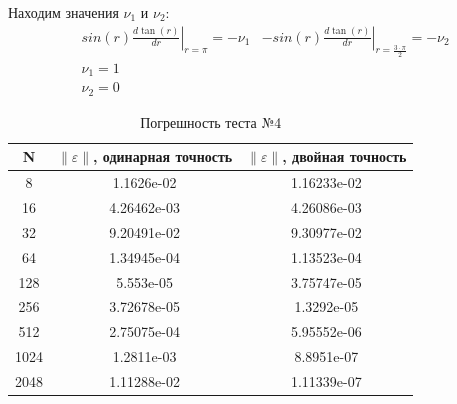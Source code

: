   Находим значения $ \nu_1 $ и $ \nu_2 $:
  \begin{align*}
		&sin(r) \left. \frac{d\tan(r)}{dr}\right\vert_{r = \pi} = -\nu _1
		&-sin(r) \left. \frac{d\tan(r)}{dr}\right\vert_{r = \frac{3 \cdot \pi}{2}} = -\nu_2 \\
    & \nu_1 = 1 \\
    &\nu_2 = 0
  \end{align*}
  \begin{table}[H]
    \centering
    \begin{tabular}{c | c | c}
      \toprule
      N & $ \left\lVert \varepsilon \right\rVert  $, одинарная точность & $ \left\lVert \varepsilon \right\rVert  $, двойная точность \\
      \midrule
      8 & 1.1626e-02 & 1.16233e-02\\
      16 & 4.26462e-03 & 4.26086e-03\\
      32 & 9.20491e-02 & 9.30977e-02\\
      64 & 1.34945e-04 & 1.13523e-04\\
      128 & 5.553e-05 & 3.75747e-05\\
      256 & 3.72678e-05 & 1.3292e-05\\
      512 & 2.75075e-04 & 5.95552e-06\\
      1024 & 1.2811e-03 & 8.8951e-07\\
      2048 & 1.11288e-02 & 1.11339e-07\\
      \bottomrule
    \end{tabular}
    \caption{Погрешность теста №4}
  \end{table}